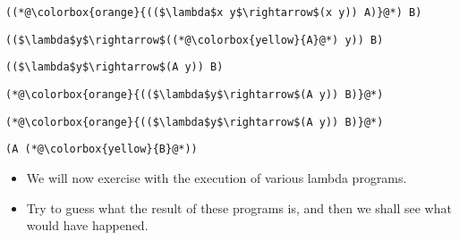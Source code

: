 \documentclass{beamer}
\begin{document}
\begin{frame}[fragile]{\CurrentSection}
\lstset{basicstyle=\ttfamily\small}\lstset{numbers=none}\lstset{language=ML}\begin{lstlisting}
((*@\colorbox{orange}{(($\lambda$x y$\rightarrow$(x y)) A)}@*) B)
\end{lstlisting}
\pause\lstset{language=ML}\begin{lstlisting}
(($\lambda$y$\rightarrow$((*@\colorbox{yellow}{A}@*) y)) B)
\end{lstlisting}

\end{frame}

\begin{frame}[fragile]{\CurrentSection}
\lstset{basicstyle=\ttfamily\small}\lstset{numbers=none}\lstset{language=ML}\begin{lstlisting}
(($\lambda$y$\rightarrow$(A y)) B)
\end{lstlisting}
\pause\lstset{language=ML}\begin{lstlisting}
(*@\colorbox{orange}{(($\lambda$y$\rightarrow$(A y)) B)}@*)
\end{lstlisting}

\end{frame}

\begin{frame}[fragile]{\CurrentSection}
\lstset{basicstyle=\ttfamily\small}\lstset{numbers=none}\lstset{language=ML}\begin{lstlisting}
(*@\colorbox{orange}{(($\lambda$y$\rightarrow$(A y)) B)}@*)
\end{lstlisting}
\pause\lstset{language=ML}\begin{lstlisting}
(A (*@\colorbox{yellow}{B}@*))
\end{lstlisting}

\end{frame}

\begin{frame}[fragile]{\CurrentSection}
\begin{block}{\CurrentSubSection}
\begin{itemize}
\item We will now exercise with the execution of various lambda programs.
\item Try to guess what the result of these programs is, and then we shall see what would have happened.

\end{itemize}

\end{block}


\end{frame}
\end{document}

